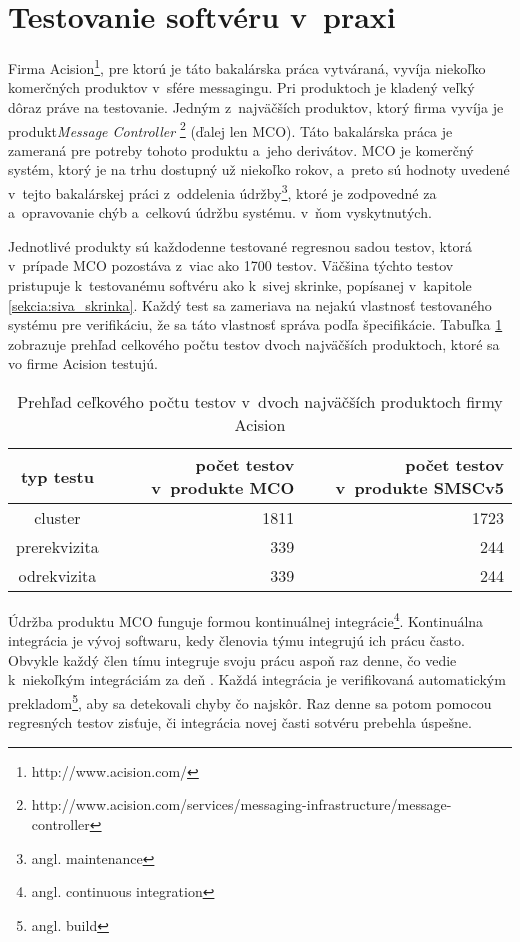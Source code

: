 \section{Testovanie softvéru v~praxi} 
\label{sekcia:testovanie_v_praxi}
Firma Acision\footnote{http://www.acision.com/}, pre ktorú je táto 
bakalárska práca vytváraná, vyvíja niekoľko komerčných produktov
v~sfére messagingu. Pri produktoch je kladený veľký dôraz práve na testovanie.
Jedným z~najväčších produktov, ktorý firma vyvíja je produkt\textit{Message Controller} 
\footnote{http://www.acision.com/services/messaging-infrastructure/message-controller}
(ďalej len MCO).
Táto bakalárska práca je zameraná pre potreby tohoto produktu a~jeho 
derivátov. MCO je komerčný systém, ktorý je na trhu dostupný už niekoľko 
rokov, a~preto sú hodnoty uvedené v~tejto bakalárskej práci z~oddelenia 
údržby\footnote{angl. maintenance}, ktoré je zodpovedné za a~opravovanie 
chýb a~celkovú údržbu systému.
v~ňom vyskytnutých. 

Jednotlivé produkty sú každodenne testované regresnou 
sadou testov, ktorá v~prípade MCO pozostáva z~viac ako 1700 testov.
Väčšina týchto testov pristupuje k~testovanému softvéru ako k~sivej 
skrinke, popísanej v~kapitole \ref{sekcia:siva_skrinka}.
Každý test sa zameriava na nejakú vlastnosť testovaného systému pre 
verifikáciu, že sa táto vlastnosť správa podľa špecifikácie.
Tabuľka \ref{tabulka:pocet_testov} zobrazuje prehľad celkového počtu 
testov dvoch najväčších produktoch, ktoré sa vo firme Acision testujú.

\begin{table}
  \begin{center}
    \begin{tabular}{| c | r | r |}
    \hline
    typ testu & počet testov v~produkte MCO & počet testov v~produkte SMSCv5 \\ \hline
    cluster & 1811 & 1723 \\ \hline
    prerekvizita & 339 & 244 \\ \hline
    odrekvizita & 339 & 244 \\
    \hline
    \end{tabular}
    \caption{Prehľad ceľkového počtu testov v~dvoch najväčších produktoch firmy Acision}
    \label{tabulka:pocet_testov}
  \end{center}
\end{table}

Údržba produktu MCO funguje formou kontinuálnej integrácie\footnote{angl. continuous integration}.
Kontinuálna integrácia je vývoj softwaru, kedy členovia týmu integrujú
ich prácu často. Obvykle každý člen tímu integruje svoju prácu aspoň 
raz denne, čo vedie k~niekoľkým integráciám za deň \cite{Continuous_integration}.
Každá integrácia je verifikovaná automatickým prekladom\footnote{angl. build}, aby sa detekovali 
chyby čo najskôr. Raz denne sa potom pomocou regresných testov zisťuje,
či integrácia novej časti sotvéru prebehla úspešne.

